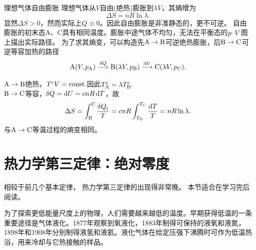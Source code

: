 \begin{example}
	{理想气体自由膨胀}{}
	理想气体从$V$自由(绝热)膨胀到$\lambda V$，其熵增为
	\begin{equation}
		\label{eq:sm-free-expansion-entropy}
		\Delta S = nR\ln\lambda.
	\end{equation}
	显然$\Delta S > 0$，然而实际上$Q \equiv 0$。因此自由膨胀是非准静态的，更不可逆。
	\tcblower
	自由膨胀的初末态A、C具有相同温度。膨胀中途气体不均匀，无法在平衡态的$p\vs V$图上描出实际路径。
	为了求其熵变，可以构造先$\text A \to \text B$可逆绝热膨胀，后$\text B \to \text C$可逆等容加热的路径
	\[
		\text A(V,p_\text A)\overset{\vd Q} \longrightarrow \text B(\lambda V,p_\text B)\overset{\d V} \longrightarrow \text C(\lambda V,p_\text C).
	\]
	\begin{notecaptionblock}
	\end{notecaptionblock}
	$\text A \to \text B$绝热，$T^cV = \const.$因此$T_\text A^c = \lambda T_\text B^c.$\\[1ex]
	$\text B \to \text C$等容，$\vd Q = \d U = cnR\d T$，故
	\[
		\Delta S = \int_\text B^\text C\frac{\vd Q_\rev}T = cnR\int_{T_\mathrm{B}}^{T_\mathrm{C}}\frac{\d T}T = nR\ln\lambda.
	\]
	与$\text A \to \text C$等温过程的熵变相同。
\end{example}


\section{热力学第三定律：绝对零度}

相较于前几个基本定律，
热力学第三定律的出现得非常晚。
本节适合在学习完后阅读。


为了探索更低能量尺度上的物理，人们需要越来越低的温度。早期获得低温的一条重要途径是气体液化。1877年观察到氧液化，1883年制得可保持的液氧和液氮，1898年和1908年分别制得液氢和液氦。液化气体在给定压强下沸腾时可作为低温热浴，用来冷却与它热接触的样品。

